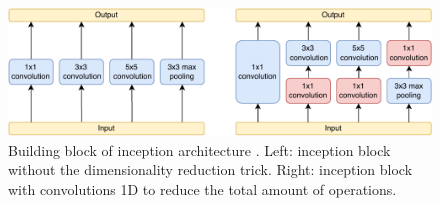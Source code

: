  \begin{figure}[hbt]
 
  \includegraphics[width=1.0\linewidth]{./distillation/images/inception.pdf}
  \caption[Inception architecture building block]{Building block of inception architecture \autocite{szegedy2015}. Left: inception block without the dimensionality reduction trick. Right: inception block with convolutions 1D to reduce the total amount of operations.}
  \label{fig:inception}
\end{figure}




